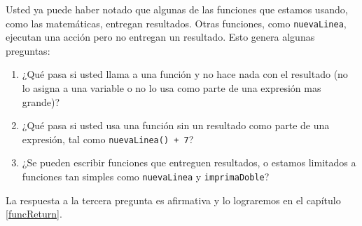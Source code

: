 Usted ya puede haber notado que algunas de las funciones que estamos
usando, como las matemáticas, entregan resultados. Otras funciones,
como \texttt{nuevaLinea}, ejecutan una acción pero no entregan un
resultado. Esto genera algunas preguntas:
\begin{enumerate}
\item ¿Qué pasa si usted llama a una función y no hace nada con el resultado
(no lo asigna a una variable o no lo usa como parte de una expresión
mas grande)?
\item ¿Qué pasa si usted usa una función sin un resultado como parte de
una expresión, tal como \texttt{nuevaLinea() + 7}?
\item ¿Se pueden escribir funciones que entreguen resultados, o estamos
limitados a funciones tan simples como \texttt{nuevaLinea} y \texttt{imprimaDoble}?
\end{enumerate}
La respuesta a la tercera pregunta es afirmativa y lo lograremos en
el capítulo \ref{funcReturn}.

